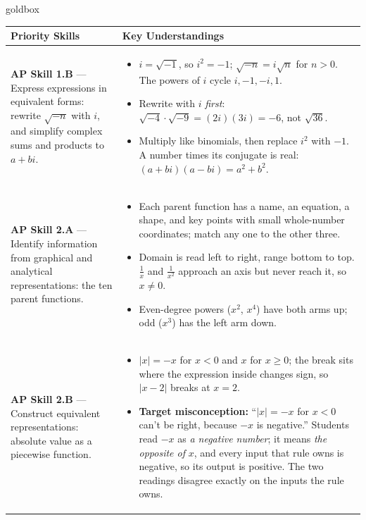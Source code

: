 \documentclass[10pt]{article}
\begin{document}
\renewcommand{\arraystretch}{1.6}
\begin{skillbox}{goldbox}
\begin{tabularx}{\linewidth}{@{}X X@{}}
\textbf{Priority Skills} &
\textbf{Key Understandings} \\
\midrule
\textbf{AP Skill 1.B} --- Express expressions in equivalent forms: rewrite $\sqrt{-n}$ with
$i$, and simplify complex sums and products to $a + bi$. &
\begin{itemize}[leftmargin=1.2em,itemsep=2pt,topsep=0pt]
  \item $i = \sqrt{-1}$, so $i^2 = -1$; $\sqrt{-n} = i\sqrt{n}$ for $n > 0$. The powers of $i$
        cycle $i, -1, -i, 1$.
  \item Rewrite with $i$ \textit{first}: $\sqrt{-4}\cdot\sqrt{-9} = (2i)(3i) = -6$, not
        $\sqrt{36}$.
  \item Multiply like binomials, then replace $i^2$ with $-1$. A number times its conjugate is
        real: $(a + bi)(a - bi) = a^2 + b^2$.
\end{itemize} \\
\textbf{AP Skill 2.A} --- Identify information from graphical and analytical representations:
the ten parent functions. &
\begin{itemize}[leftmargin=1.2em,itemsep=2pt,topsep=0pt]
  \item Each parent function has a name, an equation, a shape, and key points with small
        whole-number coordinates; match any one to the other three.
  \item Domain is read left to right, range bottom to top. $\frac{1}{x}$ and $\frac{1}{x^2}$
        approach an axis but never reach it, so $x \ne 0$.
  \item Even-degree powers ($x^2$, $x^4$) have both arms up; odd ($x^3$) has the left arm down.
\end{itemize} \\
\textbf{AP Skill 2.B} --- Construct equivalent representations: absolute value as a
piecewise function. &
\begin{itemize}[leftmargin=1.2em,itemsep=2pt,topsep=0pt]
  \item $|x| = -x$ for $x < 0$ and $x$ for $x \ge 0$; the break sits where the expression
        inside changes sign, so $|x - 2|$ breaks at $x = 2$.
  \item \textbf{Target misconception:} ``$|x| = -x$ for $x < 0$ can't be right, because $-x$
        is negative.'' Students read $-x$ as \textit{a negative number}; it means \textit{the
        opposite of} $x$, and every input that rule owns is negative, so its output is
        positive. The two readings disagree exactly on the inputs the rule owns.
\end{itemize} \\
\end{tabularx}
\end{skillbox}
\end{document}
